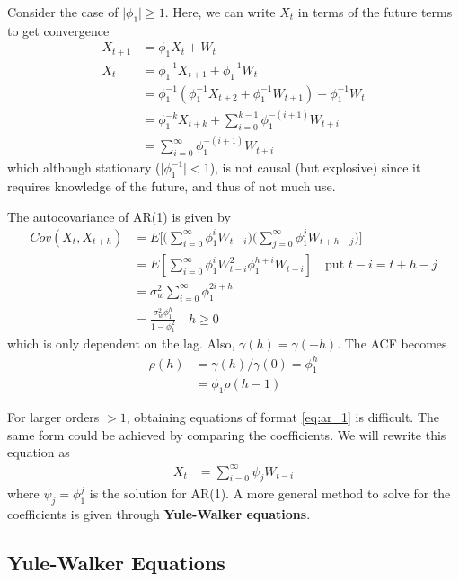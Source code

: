 \documentclass[../../time_series_notes.tex]{subfiles}
\begin{document}
Consider the case of $\lvert \phi_{1} \rvert \geq 1$. Here, we can write $X_{t}$ in terms of the future terms to get convergence
\begin{align*}
    X_{t+1} &= \phi_{1}X_{t} + W_{t}\\
    X_{t} &= \phi_{1}^{-1}X_{t+1} + \phi_{1}^{-1}W_{t}\\
    &= \phi_{1}^{-1}(\phi_{1}^{-1}X_{t+2} + \phi_{1}^{-1}W_{t+1}) + \phi_{1}^{-1}W_{t}\\
    &= \phi_{1}^{-k}X_{t+k} + \sum_{i=0}^{k-1}\phi_{1}^{-(i+1)}W_{t+i}\\
    &= \sum_{i=0}^{\infty}\phi_{1}^{-(i+1)}W_{t+i}
\end{align*}
which although stationary ($\lvert \phi_{1}^{-1} \rvert < 1$), is not causal (but explosive) since it requires knowledge of the future, and thus of not much use.\newline

The autocovariance of AR(1) is given by
\begin{align*}
    Cov(X_{t}, X_{t+h}) &= E \bigg[\bigg(\sum_{i=0}^{\infty}\phi_{1}^{i}W_{t-i} \bigg) \bigg(\sum_{j=0}^{\infty}\phi_{1}^{j}W_{t+h-j} \bigg) \bigg]\\
    &= E[\sum_{i=0}^{\infty}\phi_{1}^{i}W_{t-i}^{2} \phi_{1}^{h+i}W_{t-i}] \quad \text{put $t-i = t+h-j$}\\
    &= \sigma_{w}^{2} \sum_{i=0}^{\infty}\phi_{1}^{2i+h}\\
    &= \frac{\sigma_{w}^{2} \phi_{1}^{h}}{1-\phi_{1}^{2}} \quad h \geq 0
\end{align*}
which is only dependent on the lag. Also, $\gamma(h) = \gamma(-h)$. The ACF becomes
\begin{align*}
    \rho(h) &= \gamma(h)/\gamma(0) = \phi_{1}^{h}\\
     &= \phi_{1}\rho(h-1)
\end{align*}

For larger orders $> 1$, obtaining equations of format \eqref{eq:ar_1} is difficult. The same form could be achieved by comparing the coefficients. We will rewrite this equation as
\begin{align*}
    X_{t} &= \sum_{i=0}^{\infty}\psi_{j}W_{t-i}
\end{align*}
where $\psi_{j} = \phi_{1}^{j}$ is the solution for AR(1). A more general method to solve for the coefficients is given through \textbf{Yule-Walker equations}.

\subsection{Yule-Walker Equations}
\end{document}
